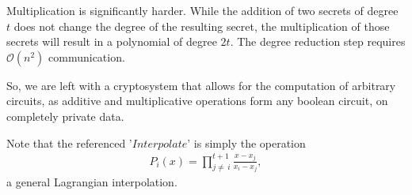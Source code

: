 \documentclass[journal,11pt]{IEEEtran}
\begin{document}
\par Multiplication is significantly harder. While the addition of two secrets of degree $t$ does not change the degree of the resulting secret, the multiplication of those secrets will result in a polynomial of degree $2t$. The degree reduction step requires $\mathcal{O}(n^2)$ communication. 

\par So, we are left with a cryptosystem that allows for the computation of arbitrary circuits, as additive and multiplicative operations form any boolean circuit, on completely private data.

\par Note that the referenced '$Interpolate$' is simply the operation
\begin{gather} 
P_i(x) = \prod_{j\neq\,i}^{t+1} \frac{x - x_j}{x_i - x_j},
\end{gather}
a general Lagrangian interpolation. 
\end{document}
